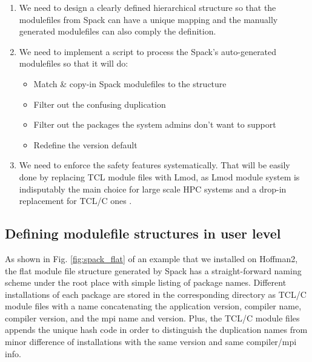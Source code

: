 \documentclass[conference]{IEEEtran}
\begin{document}
\begin{enumerate}
    \item We need to design a clearly defined hierarchical structure so that the modulefiles from Spack can have a unique mapping and the manually generated modulefiles can also comply the definition.
    \item We need to implement a script to process the Spack's auto-generated modulefiles so that it will do:
        \begin{itemize}
            \item Match \& copy-in Spack modulefiles to the structure
            \item Filter out the confusing duplication
            \item Filter out the packages the system admins don't want to support
            \item Redefine the version default
        \end{itemize}
    \item We need to enforce the safety features systematically. That will be easily done by replacing TCL module files with Lmod, as Lmod module system is indisputably the main choice for large scale HPC systems and a drop-in replacement for TCL/C ones \cite{mclay:11}.
\end{enumerate}

\subsection{Defining modulefile structures in user level} \label{subsec_redefine_h2_modulefiles}

As shown in Fig. \ref{fig:spack_flat} of an example that we installed on Hoffman2, the flat module file structure generated by Spack has a straight-forward naming scheme under the root place with simple listing of package names. Different installations of each package are stored in the corresponding directory as TCL/C module files with a name concatenating the application version, compiler name, compiler version, and the mpi name and version. Plus, the TCL/C module files appends the unique hash code in order to distinguish the duplication names from minor difference of installations with the same version and same compiler/mpi info.
\end{document}
